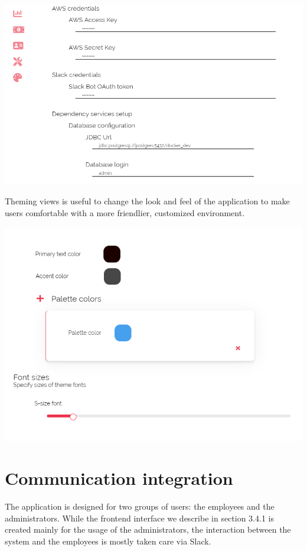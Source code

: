 \documentclass[licencjacka,en]{thesisclass}
\begin{document}
    \includegraphics[width=\textwidth] {imgs/screenshots/screen_customize_settings.png}
    
    Theming views is useful to change the look and feel of the application
    to make users comfortable with a more friendlier, customized environment.
    
    \includegraphics[width=\textwidth] {imgs/screenshots/screen_customize_theme.png}
    
    \section{Communication integration}
    The application is designed for two groups of users: the employees and the administrators.
    While the frontend interface we describe in section 3.4.1 is created mainly for the usage
    of the administrators, the interaction between the system and the employees is mostly
    taken care via Slack.
\end{document}

